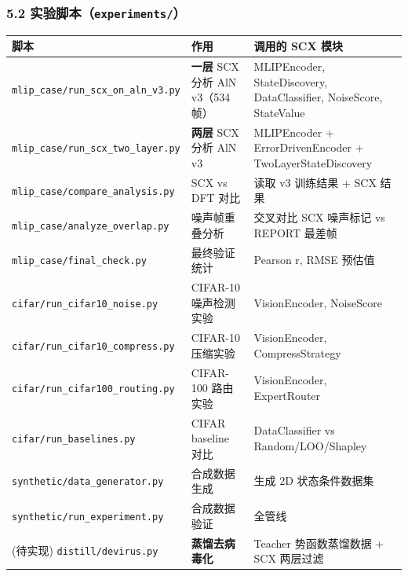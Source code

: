 \documentclass[
  12pt,
]{ctexart}
\begin{document}
\subsubsection{\texorpdfstring{5.2
实验脚本（\texttt{experiments/}）}{5.2 实验脚本（experiments/）}}\label{ux5b9eux9a8cux811aux672cexperiments}

\begin{longtable}[]{@{}
  >{\raggedright\arraybackslash}p{}
  >{\raggedright\arraybackslash}p{}
  >{\raggedright\arraybackslash}p{}@{}}
\toprule\noalign{}
\begin{minipage}[b]{\linewidth}\raggedright
脚本
\end{minipage} & \begin{minipage}[b]{\linewidth}\raggedright
作用
\end{minipage} & \begin{minipage}[b]{\linewidth}\raggedright
调用的 SCX 模块
\end{minipage} \\
\midrule\noalign{}
\endhead
\bottomrule\noalign{}
\endlastfoot
\texttt{mlip\_case/run\_scx\_on\_aln\_v3.py} & \textbf{一层} SCX 分析
AlN v3（534帧） & MLIPEncoder, StateDiscovery, DataClassifier,
NoiseScore, StateValue \\
\texttt{mlip\_case/run\_scx\_two\_layer.py} & \textbf{两层} SCX 分析 AlN
v3 & MLIPEncoder + ErrorDrivenEncoder + TwoLayerStateDiscovery \\
\texttt{mlip\_case/compare\_analysis.py} & SCX vs DFT 对比 & 读取 v3
训练结果 + SCX 结果 \\
\texttt{mlip\_case/analyze\_overlap.py} & 噪声帧重叠分析 & 交叉对比 SCX
噪声标记 vs REPORT 最差帧 \\
\texttt{mlip\_case/final\_check.py} & 最终验证统计 & Pearson r, RMSE
预估值 \\
\texttt{cifar/run\_cifar10\_noise.py} & CIFAR-10 噪声检测实验 &
VisionEncoder, NoiseScore \\
\texttt{cifar/run\_cifar10\_compress.py} & CIFAR-10 压缩实验 &
VisionEncoder, CompressStrategy \\
\texttt{cifar/run\_cifar100\_routing.py} & CIFAR-100 路由实验 &
VisionEncoder, ExpertRouter \\
\texttt{cifar/run\_baselines.py} & CIFAR baseline 对比 & DataClassifier
vs Random/LOO/Shapley \\
\texttt{synthetic/data\_generator.py} & 合成数据生成 & 生成 2D
状态条件数据集 \\
\texttt{synthetic/run\_experiment.py} & 合成数据验证 & 全管线 \\
(待实现) \texttt{distill/devirus.py} & \textbf{蒸馏去病毒化} & Teacher
势函数蒸馏数据 + SCX 两层过滤 \\
\end{longtable}
\end{document}

